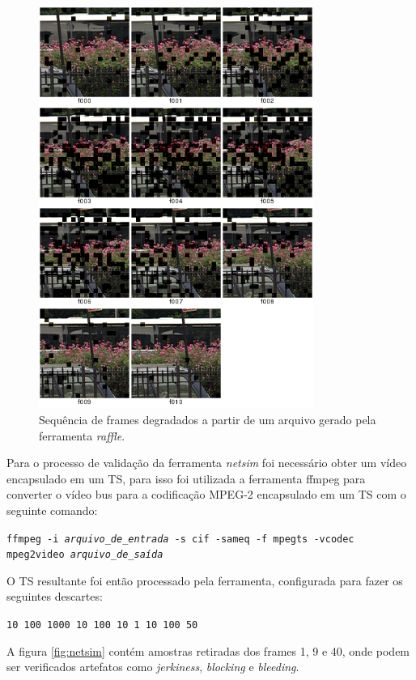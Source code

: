 \begin{figure}[!htb]
	\centering
	\includegraphics[width=0.8\textwidth]{./imgs/busraffle.png}
	\caption{Sequência de frames degradados a partir de um arquivo gerado pela ferramenta \emph{raffle}.}
	\label{fig:busraffle}
\end{figure}

Para o processo de validação da ferramenta \emph{netsim} foi necessário obter um vídeo encapsulado em um TS, para isso foi utilizada a ferramenta ffmpeg para converter o vídeo bus para a codificação MPEG-2 encapsulado em um TS com o seguinte comando:

{
	\centering
	\texttt{ffmpeg -i \emph{arquivo\_de\_entrada} -s cif -sameq -f mpegts -vcodec mpeg2video \emph{arquivo\_de\_saída}}
}

O TS resultante foi então processado pela ferramenta, configurada para fazer os seguintes descartes:

\begin{center}
	\texttt{10 100
	1000 10
	100 10
	1 10
	100 50}
\end{center}

A figura \ref{fig:netsim} contém amostras retiradas dos frames 1, 9 e 40, onde podem ser verificados artefatos como \emph{jerkiness}, \emph{blocking} e \emph{bleeding}.

